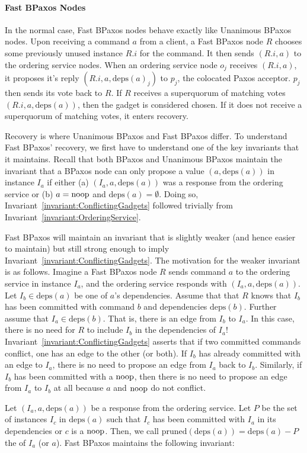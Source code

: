 \documentclass{mwhittaker}
\theoremstyle{definition}
\newcommand{\deps}[1]{\text{deps}(#1)}
\newcommand{\invref}[1]{Invariant~\ref{invariant:#1}}
\begin{document}
\paragraph{Fast BPaxos Nodes}
In the normal case, Fast BPaxos nodes behave exactly like Unanimous BPaxos
nodes. Upon receiving a command $a$ from a client, a Fast BPaxos node $R$
chooses some previously unused instance $R.i$ for the command. It then sends
$(R.i, a)$ to the ordering service nodes.
%
When an ordering service node $o_j$ receives $(R.i, a)$, it proposes it's reply
$(R.i, a, \deps{a}_j)$ to $p_j$, the colocated Paxos acceptor. $p_j$ then sends
its vote back to $R$.
%
If $R$ receives a superquorum of matching votes $(R.i, a, \deps{a})$, then the
gadget is considered chosen. If it does not receive a superquorum of matching
votes, it enters recovery.

Recovery is where Unanimous BPaxos and Fast BPaxos differ. To understand Fast
BPaxos' recovery, we first have to understand one of the key invariants that it
maintains. Recall that both BPaxos and Unanimous BPaxos maintain the invariant
that a BPaxos node can only propose a value $(a, \deps{a})$ in instance $I_a$
if either (a) $(I_a, a, \deps{a})$ was a response from the ordering service or
(b) $a = \text{noop}$ and $\deps{a} = \emptyset$. Doing so,
\invref{ConflictingGadgets} followed trivially from \invref{OrderingService}.

Fast BPaxos will maintain an invariant that is slightly weaker (and hence
easier to maintain) but still strong enough to imply
\invref{ConflictingGadgets}. The motivation for the weaker invariant is as
follows. Imagine a Fast BPaxos node $R$ sends command $a$ to the ordering
service in instance $I_a$, and the ordering service responds with $(I_a, a,
\deps{a})$. Let $I_b \in \deps{a}$ be one of $a$'s dependencies. Assume that
that $R$ knows that $I_b$ has been committed with command $b$ and dependencies
$\deps{b}$. Further assume that $I_a \in \deps{b}$. That is, there is an edge
from $I_b$ to $I_a$. In this case, there is no need for $R$ to include $I_b$ in
the dependencies of $I_a$! \invref{ConflictingGadgets} asserts that if two
committed commands conflict, one has an edge to the other (or both). If $I_b$
has already committed with an edge to $I_a$, there is no need to propose an
edge from $I_a$ back to $I_b$.
%
Similarly, if $I_b$ has been committed with a $\text{noop}$, then there is no need to
propose an edge from $I_a$ to $I_b$ at all because $a$ and $\text{noop}$ do not
conflict.

\newcommand{\pruned}{\text{pruned}}
Let $(I_a, a, \deps{a})$ be a response from the ordering service. Let $P$ be
the set of instances $I_c$ in $\deps{a}$ such that $I_c$ has been committed
with $I_a$ in its dependencies or $c$ is a $\text{noop}$. Then, we call
$\pruned(\deps{a}) = \deps{a} - P$ the  of $I_a$
(or $a$). Fast BPaxos maintains the following invariant:
\end{document}
